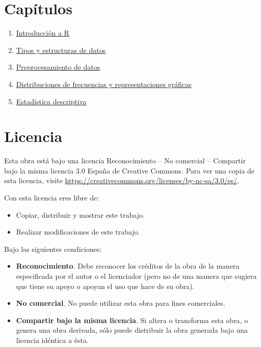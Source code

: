 \documentclass[
  a4paper,
]{scrreport}
\providecommand{\tightlist}{%
  \setlength{\itemsep}{0pt}\setlength{\parskip}{0pt}}\usepackage{longtable,booktabs,array}
\theoremstyle{definition}
\theoremstyle{remark}
\begin{document}
\section*{Capítulos}\label{capuxedtulos}


\begin{enumerate}
\def\labelenumi{\arabic{enumi}.}
\tightlist
\item
  \href{./01-intro.qmd}{Introducción a R}
\item
  \href{02-tipos-datos.qmd}{Tipos y estructuras de datos}
\item
  \href{03-preprocesamiento-datos.qmd}{Preprocesamiento de datos}
\item
  \href{04-frecuencias-graficos.qmd}{Distribuciones de frecuencias y
  representaciones gráficas}
\item
  \href{05-descriptiva.qmd}{Estadística descriptiva}
\end{enumerate}

\section*{Licencia}\label{licencia}


Esta obra está bajo una licencia Reconocimiento -- No comercial --
Compartir bajo la misma licencia 3.0 España de Creative Commons. Para
ver una copia de esta licencia, visite
\url{https://creativecommons.org/licenses/by-nc-sa/3.0/es/}.

Con esta licencia eres libre de:

\begin{itemize}
\tightlist
\item
  Copiar, distribuir y mostrar este trabajo.
\item
  Realizar modificaciones de este trabajo.
\end{itemize}

Bajo las siguientes condiciones:

\begin{itemize}
\item
  \textbf{Reconocimiento}. Debe reconocer los créditos de la obra de la
  manera especificada por el autor o el licenciador (pero no de una
  manera que sugiera que tiene su apoyo o apoyan el uso que hace de su
  obra).
\item
  \textbf{No comercial}. No puede utilizar esta obra para fines
  comerciales.
\item
  \textbf{Compartir bajo la misma licencia}. Si altera o transforma esta
  obra, o genera una obra derivada, sólo puede distribuir la obra
  generada bajo una licencia idéntica a ésta.
\end{itemize}
\end{document}
